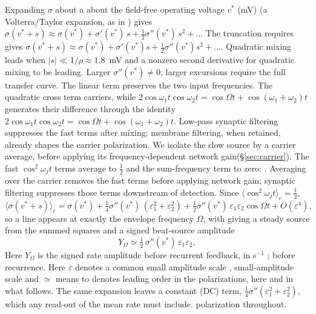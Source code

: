 \documentclass[11pt,a4paper]{article}
\newcommand{\Sig}{\sigma}
\newcommand{\half}{\tfrac{1}{2}}
\providecommand{\DIFaddtex}[1]{{\protect\color{blue} \sf #1}} %
\providecommand{\DIFdeltex}[1]{{\protect\color{red} \scriptsize #1}} %
\providecommand{\DIFaddbegin}{} %
\providecommand{\DIFaddend}{} %
\providecommand{\DIFdelbegin}{} %
\providecommand{\DIFdelend}{} %
\providecommand{\DIFadd}[1]{\texorpdfstring{\DIFaddtex{#1}}{#1}} %
\providecommand{\DIFdel}[1]{\texorpdfstring{\DIFdeltex{#1}}{}} %
\begin{document}
Expanding \DIFdelbegin \DIFdel{$\Sig$ about a }\DIFdelend \DIFaddbegin \DIFadd{about the }\DIFaddend field-free \DIFdelbegin \DIFdel{operating }\DIFdelend voltage $v^*$ (mV)
\DIFdelbegin \DIFdel{(a Volterra/Taylor expansion, as
in \cite{ruffini2025ham} ) gives
$\Sig(v^*+s)\approx\Sig(v^*)+\Sig'(v^*)\,s+\half\Sig''(v^*)\,s^2+\dots$
The truncation requires }\DIFdelend \DIFaddbegin \DIFadd{\cite{ruffini2025ham} gives
$\Sig(v^*+s)\approx\Sig(v^*)+\Sig'(v^*)s+\half\Sig''(v^*)s^2+\dots$.
Quadratic mixing leads when }\DIFaddend $|s|\ll1/\rho\approx1.8$~mV and
\DIFdelbegin \DIFdel{a nonzero second derivative
for quadratic mixing to be leading. Larger }\DIFdelend \DIFaddbegin \DIFadd{$\Sig''(v^*)\ne0$; larger }\DIFaddend excursions require the full \DIFdelbegin \DIFdel{transfer }\DIFdelend curve.
The linear term preserves the \DIFdelbegin \DIFdel{two input frequencies. The quadratic cross term
}\DIFdelend \DIFaddbegin \DIFadd{carriers, while
$2\cos\omega_1t\cos\omega_2t=\cos\Omega t+\cos(\omega_1+\omega_2)t$
}\DIFaddend generates their difference\DIFdelbegin \DIFdel{through the identity
$2\cos\omega_1t\cos\omega_2t=\cos\Omega t+\cos(\omega_1+\omega_2)t$. Low-pass synaptic filtering suppresses the fast terms after mixing; membrane
filtering, when retained, already shapes the carrier polarization. We isolate
the slow source by a carrier average, before applying its frequency-dependent
network gain(\S\ref{sec:carrier}). The fast
$\cos^2\omega_jt$ terms
average to $\half$ and the sum-frequency term to zero:
}\DIFdelend \DIFaddbegin \DIFadd{. Averaging over the carrier removes the fast terms
before applying network gain; synaptic filtering suppresses those terms
downstream of detection. Since $\langle\cos^2\omega_jt\rangle_c=\half$,
}\DIFaddend \begin{equation}
\big\langle\Sig(v^*+s)\big\rangle_c
=\Sig(v^*)+\tfrac14\Sig''(v^*)\,(\varepsilon_1^2+\varepsilon_2^2)
+\tfrac12\Sig''(v^*)\,\varepsilon_1\varepsilon_2\cos\Omega t+O(\varepsilon^4),
\label{eq:taylor}
\end{equation}
\DIFdelbegin \DIFdel{so a line appears at exactly the envelope frequency $\Omega$, with }\DIFdelend \DIFaddbegin \DIFadd{giving a steady source from the summed squares and a signed beat-source }\DIFaddend amplitude
\begin{equation}
Y_\Omega\simeq\half\,\Sig''(v^*)\,\varepsilon_1\varepsilon_2 ,
\label{eq:demod}
\end{equation}
\DIFdelbegin \DIFdel{Here $Y_\Omega$ is the signed rate amplitude before recurrent feedback, }\DIFdelend in s$^{-1}$ \DIFdelbegin \DIFdel{;
}\DIFdelend \DIFaddbegin \DIFadd{before recurrence.
Here }\DIFaddend $\varepsilon$ denotes a common \DIFdelbegin \DIFdel{small amplitude scale , }\DIFdelend \DIFaddbegin \DIFadd{small-amplitude scale }\DIFaddend and $\simeq$
\DIFdelbegin \DIFdel{means to }\DIFdelend \DIFaddbegin \DIFadd{denotes }\DIFaddend leading order in \DIFdelbegin \DIFdel{the polarizations, here and in what follows.
The
same expansion leaves a constant (DC) term, $\tfrac14\Sig''(\varepsilon_1^2+\varepsilon_2^2)$,
which any read-out of the mean rate must include.
}\DIFdelend \DIFaddbegin \DIFadd{polarization throughout.
}\DIFaddend
\end{document}
